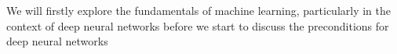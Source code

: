 We will firstly explore the fundamentals of machine learning, particularly in the context of deep neural networks before we start to discuss the preconditions for deep neural networks